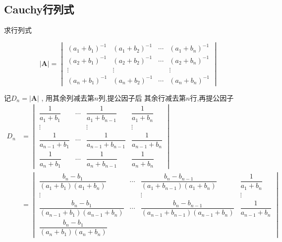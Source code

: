 \subsection{Cauchy行列式}
\begin{brown}
\begin{example}
    求行列式\vfill

\[
\left|\bm{A}\right|
=
\begin{vmatrix}
    \left(a_1+b_1\right)^{-1}
    &\left(a_1+b_2\right)^{-1}
    &\cdots&
    \left(a_1+b_n\right)^{-1}\\
    \left(a_2+b_1\right)^{-1}&
    \left(a_2+b_2\right)^{-1}&\cdots
    &\left(a_2+b_n\right)^{-1}\\
    \vdots&\vdots&&\vdots\\
    \left(a_n+b_1\right)^{-1}&
    \left(a_n+b_2\right)^{-1}&
    \cdots&\left(a_n+b_n\right)^{-1}
\end{vmatrix}
\]
\end{example}
    \begin{solution}
记$D_n=\left|\bm{A}\right|$
,
用其余列减去第$n$列,提公因子后
其余行减去第$n$行,再提公因子
\begin{align*}
    D_n&=
    \begin{vmatrix}
        \dfrac{1}{a_1+b_1}&\cdots
        &\dfrac{1}{a_1+b_{n-1}}
        &\dfrac{1}{a_1+b_n}\\
        \vdots&&\vdots&\vdots\\
        \dfrac{1}{a_{n-1}+b_1}&
        \cdots&\dfrac{1}{a_{n-1}+b_{n-1}}&
        \dfrac{1}{a_{n-1}+b_n}\\[1em]
        \dfrac{1}{a_n+b_1}&\cdots
        &\dfrac{1}{a_n+b_{n-1}}
        &\dfrac{1}{a_n+b_n}
    \end{vmatrix}\\
    &=
    \begin{vmatrix}
        \dfrac{b_n-b_1}{\left(a_1+b_1\right)
        \left(a_1+b_n\right)}
        &\cdots&
        \dfrac{b_n-b_{n-1}}{\left(a_1+b_{n-1}\right)
        \left(a_1+b_n\right)}&
        \dfrac{1}{a_1+b_n}\\
        \vdots&&\vdots&\vdots\\
        \dfrac{b_n-b_1}{\left(
            a_{n-1}+b_1
        \right)\left(
            a_{n-1}+b_n
        \right)}&\cdots
        &\dfrac{b_n-b_{n-1}}{\left(
            a_{n-1}+b_{n-1}
        \right)\left(
            a_{n-1}+b_n
        \right)}&\dfrac{1}{a_{n-1}+b_n}\\[1em]
        \dfrac{b_n-b_1}{\left(
            a_n+b_1
        \right)\left(a_n+b_n\right)}

\end{vmatrix}
\end{align*}
\end{solution}
\end{brown}
